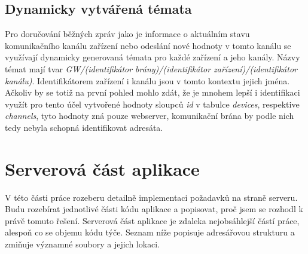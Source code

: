 \subsection{Dynamicky vytvářená témata}

Pro doručování běžných zpráv jako je informace o aktuálním stavu komunikačního kanálu zařízení nebo odeslání nové hodnoty v tomto kanálu se využívají dynamicky generovaná témata pro každé zařízení a jeho kanály. Názvy témat mají tvar \emph{GW/(identifikátor brány)/(identifikátor zařízení)/(identifikátor kanálu)}. Identifikátorem zařízení i kanálu jsou v tomto kontextu jejich jména. Ačkoliv by se totiž na první pohled mohlo zdát, že je mnohem lepší i identifikaci využít pro tento účel vytvořené hodnoty sloupců \emph{id} v tabulce \emph{devices}, respektive \emph{channels}, tyto hodnoty zná pouze webserver, komunikační brána by podle nich tedy nebyla schopná identifikovat adresáta.

\section{Serverová část aplikace}

V této části práce rozeberu detailně implementaci požadavků na straně serveru. Budu rozebírat jednotlivé části kódu aplikace a popisovat, proč jsem se rozhodl k právě tomuto řešení. Serverová část aplikace je zdaleka nejobsáhlejší částí práce, alespoň co se objemu kódu týče. Seznam níže popisuje adresářovou strukturu a zmiňuje významné soubory a jejich lokaci.


